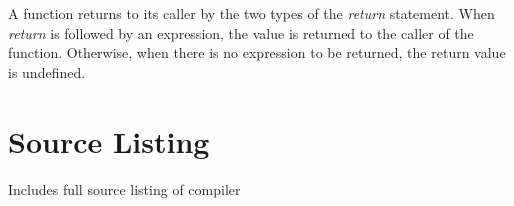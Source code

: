 \documentclass{l3proj}
\begin{document}
A function returns to its caller by the two types of the \textit{return} statement. When \textit{return} is followed by an expression, the value is returned to the caller of the function. Otherwise, when there is no expression to be returned, the return value is undefined. 



\chapter{Source Listing}
\label{appa}

Includes full source listing of compiler




\end{document}
